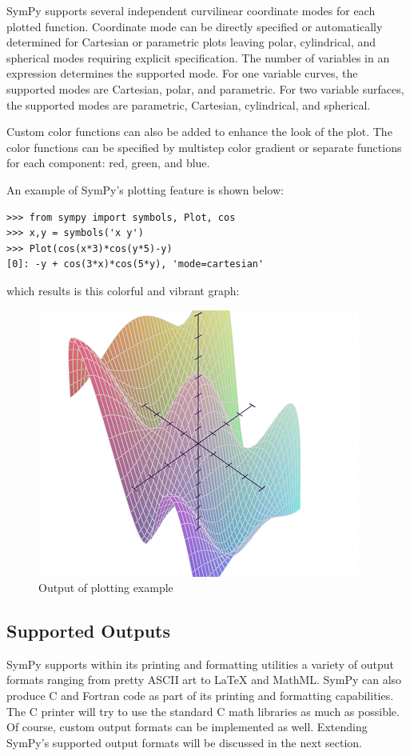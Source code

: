 \documentclass[11pt]{article}
\begin{document}
SymPy supports several independent curvilinear coordinate modes for each plotted function. Coordinate mode can be directly specified or automatically determined for Cartesian or parametric plots leaving polar, cylindrical, and spherical modes requiring explicit specification. The number of variables in an expression determines the supported mode. For one variable curves, the supported modes are Cartesian, polar, and parametric. For two variable surfaces, the supported modes are parametric, Cartesian, cylindrical, and spherical.

Custom color functions can also be added to enhance the look of the plot. The color functions can be specified by multistep color gradient or separate functions for each component: red, green, and blue.

An example of SymPy’s plotting feature is shown below:

\begin{lstlisting}
>>> from sympy import symbols, Plot, cos
>>> x,y = symbols('x y')
>>> Plot(cos(x*3)*cos(y*5)-y)
[0]: -y + cos(3*x)*cos(5*y), 'mode=cartesian'
\end{lstlisting}

which results is this colorful and vibrant graph:

\begin{figure}[h!]
\centering
\includegraphics{plot.jpg}
\caption{Output of plotting example}
\end{figure}

\subsection{Supported Outputs}

SymPy supports within its printing and formatting utilities a variety of output formats ranging from pretty ASCII art to LaTeX and MathML. SymPy can also produce C and Fortran code as part of its printing and formatting capabilities. The C printer will try to use the standard C math libraries as much as possible. Of course, custom output formats can be implemented as well. Extending SymPy’s supported output formats will be discussed in the next section.
\end{document}
